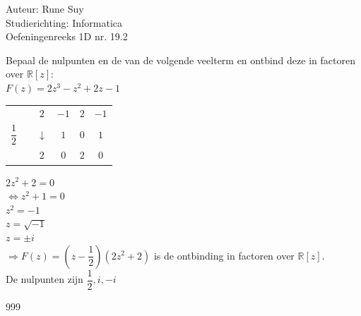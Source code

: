 \documentclass[a4paper]{article}
\begin{document}
  
\noindent \large Auteur: Rune Suy \\
\noindent \large Studierichting: Informatica\\
\noindent \large Oefeningenreeks 1D nr. 19.2\\

\medskip

\normalsize

Bepaal de nulpunten en de van de volgende veelterm en ontbind deze in factoren over $\mathbb{R}[z]$: \\

$F(z) = 2z^3 - z^2 + 2z - 1$\\

\begin{tabular}{ c c c c c c }
                    &\vline     &$2$            &$-1$ &$2$  &$-1$ \\  
    $\dfrac{1}{2}$  &\vline     &$\downarrow$   &$1$  &$0$  &$1$ \\  
    \hline          & \vline    & $2$           &$0$  &$2$  &\vline $0$ \\
\end{tabular}

\bigskip

$2z^2 + 2 = 0$\\

$\Leftrightarrow z^2 + 1 = 0$\\

$z^2 = -1$\\	

$z = \sqrt{-1}$\\

$z = \pm i$\\

$\Rightarrow F(z) = \left( z - \dfrac{1}{2}\right) \left(2z^2 + 2\right)$ is de ontbinding in factoren over $\mathbb{R}[z]$.\\

De nulpunten zijn $\dfrac{1}{2}, i, -i$\\

\begin{thebibliography}{999}
\end{thebibliography}
\end{document}

